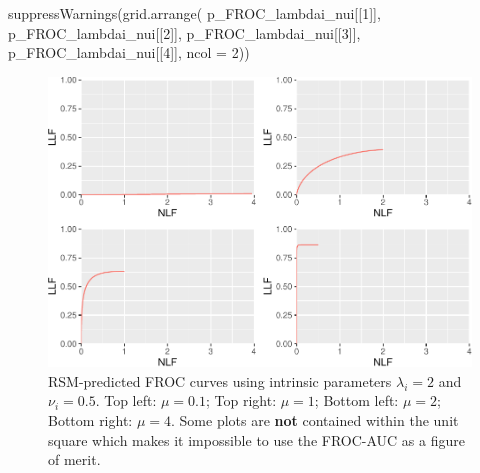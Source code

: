 \documentclass[
]{book}
\newenvironment{Shaded}{\begin{snugshade}}{\end{snugshade}}
\newcommand{\AttributeTok}[1]{\textcolor[rgb]{0.77,0.63,0.00}{#1}}
\newcommand{\DecValTok}[1]{\textcolor[rgb]{0.00,0.00,0.81}{#1}}
\newcommand{\FunctionTok}[1]{\textcolor[rgb]{0.00,0.00,0.00}{#1}}
\newcommand{\NormalTok}[1]{#1}
\begin{document}
\begin{Shaded}
\begin{Highlighting}[]
\FunctionTok{suppressWarnings}\NormalTok{(}\FunctionTok{grid.arrange}\NormalTok{(}
\NormalTok{p\_FROC\_lambdai\_nui[[}\DecValTok{1}\NormalTok{]],}
\NormalTok{p\_FROC\_lambdai\_nui[[}\DecValTok{2}\NormalTok{]],}
\NormalTok{p\_FROC\_lambdai\_nui[[}\DecValTok{3}\NormalTok{]],}
\NormalTok{p\_FROC\_lambdai\_nui[[}\DecValTok{4}\NormalTok{]], }\AttributeTok{ncol =} \DecValTok{2}\NormalTok{))}
\end{Highlighting}
\end{Shaded}

\begin{figure}
\centering
\includegraphics{08-rsm-predictions2_files/figure-latex/rsm-other-predictions-froc-plots-lambdai-nui-1.pdf}
\caption{\label{fig:rsm-other-predictions-froc-plots-lambdai-nui}RSM-predicted FROC curves using intrinsic parameters \(\lambda_i = 2\) and \(\nu_i = 0.5\). Top left: \(\mu = 0.1\); Top right: \(\mu = 1\); Bottom left: \(\mu = 2\); Bottom right: \(\mu = 4\). Some plots are \textbf{not} contained within the unit square which makes it impossible to use the FROC-AUC as a figure of merit.}
\end{figure}
\end{document}
